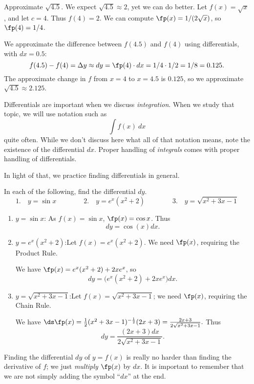 \begin{example}\label{ex_diffal2}
Approximate $\sqrt{4.5}$.
\solution
We expect $\sqrt{4.5} \approx 2$, yet we can do better. Let $f(x) = \sqrt{x}$, and let $c=4$. Thus $f(4) = 2$. We can compute $\fp(x) = 1/(2\sqrt{x})$, so $\fp(4) = 1/4$. 

We approximate the difference between $f(4.5)$ and $f(4)$ using differentials, with $dx = 0.5$:
\[f(4.5)-f(4) = \Delta y \approx dy = \fp(4)\cdot dx = 1/4 \cdot 1/2 = 1/8 = 0.125.\]
The approximate change in $f$ from $x=4$ to $x=4.5$ is $0.125$, so we approximate $\sqrt{4.5} \approx 2.125$.
\end{example}

Differentials are important when we discuss \emph{integration}. When we study that topic, we will use notation such as
\[\int f(x)\ dx\]
quite often. While we don't discuss here what all of that notation means, note the existence of the differential $dx$. Proper handling of \emph{integrals} comes with proper handling of differentials. 

In light of that, we practice finding differentials in general.

\begin{example}\label{ex_diffal3}
In each of the following, find the differential $dy$.
\[
\text{1.}\quad y = \sin x\qquad\qquad
\text{2.}\quad y = e^x(x^2+2)\qquad\qquad
\text{3.}\quad y = \sqrt{x^2+3x-1}
\]
\solution
\begin{enumerate}
	\item	$y = \sin x$:	\quad As $f(x) = \sin x$, $\fp(x) = \cos x$. Thus
	\[dy = \cos (x)dx.\]
	\item	$y = e^x(x^2+2)$:\quad Let $f(x) = e^x(x^2+2)$. We need $\fp(x)$, requiring the Product Rule. 

We have $\fp(x) = e^x(x^2+2) + 2xe^x$, so
\[dy = \bigl(e^x(x^2+2) + 2xe^x\bigr)dx.\]

	\item	$y = \sqrt{x^2+3x-1}$:\quad	Let $f(x) = \sqrt{x^2+3x-1}$; we need $\fp(x)$, requiring the Chain Rule.

We have $\ds \fp(x) = \frac{1}{2}(x^2+3x-1)^{-\frac12}(2x+3) = \frac{2x+3}{2\sqrt{x^2+3x-1}}.$ Thus 
\[dy = \frac{(2x+3)dx}{2\sqrt{x^2+3x-1}}.\]
\end{enumerate}
\end{example}

Finding the differential $dy$ of $y=f(x)$ is really no harder than finding the derivative of $f$; we just \emph{multiply} $\fp(x)$ by $dx$. It is important to remember that we are not simply adding the symbol ``$dx$'' at the end.\\

